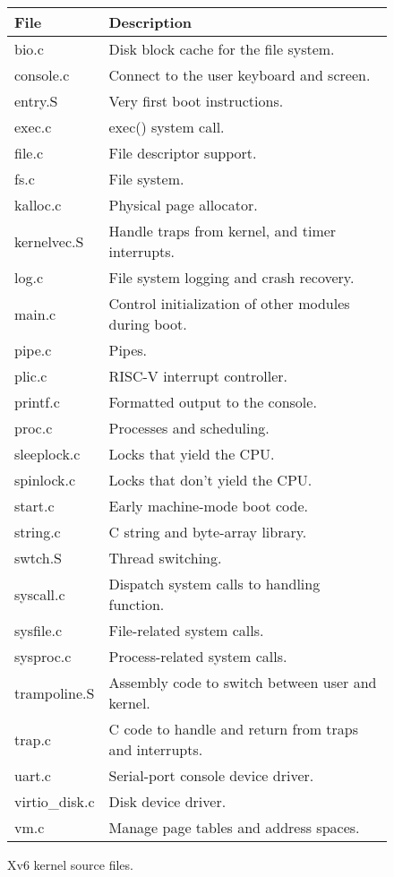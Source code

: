 \begin{figure}[t]
\center
\begin{tabular}{l|l}
{\bf File} & {\bf Description} \\
\midrule
bio.c & Disk block cache for the file system. \\
console.c & Connect to the user keyboard and screen. \\
entry.S & Very first boot instructions. \\
exec.c & exec() system call. \\
file.c & File descriptor support. \\
fs.c & File system. \\
kalloc.c & Physical page allocator. \\
kernelvec.S & Handle traps from kernel, and timer interrupts. \\
log.c & File system logging and crash recovery. \\
main.c & Control initialization of other modules during boot. \\
pipe.c & Pipes. \\
plic.c & RISC-V interrupt controller. \\
printf.c & Formatted output to the console. \\
proc.c & Processes and scheduling. \\
sleeplock.c & Locks that yield the CPU. \\
spinlock.c & Locks that don't yield the CPU. \\
start.c & Early machine-mode boot code. \\
string.c & C string and byte-array library. \\
swtch.S & Thread switching. \\
syscall.c & Dispatch system calls to handling function. \\
sysfile.c & File-related system calls. \\
sysproc.c & Process-related system calls. \\
trampoline.S & Assembly code to switch between user and kernel. \\
trap.c & C code to handle and return from traps and interrupts. \\
uart.c & Serial-port console device driver. \\
virtio\_disk.c & Disk device driver. \\
vm.c & Manage page tables and address spaces. \\
\end{tabular}
\caption{Xv6 kernel source files.}
\label{fig:source}
\end{figure}


